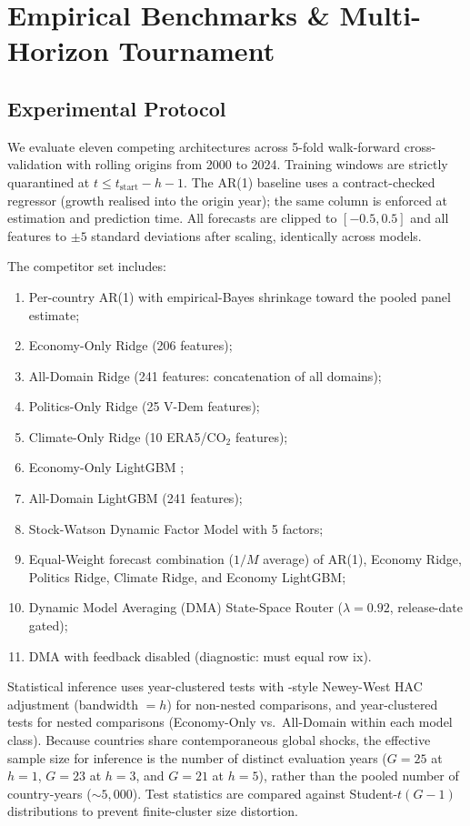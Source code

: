 \documentclass[11pt,a4paper]{article}
\begin{document}
\section{Empirical Benchmarks \& Multi-Horizon Tournament}
\label{sec:benchmarks}

\subsection{Experimental Protocol}

We evaluate eleven competing architectures across 5-fold walk-forward cross-validation with rolling origins from 2000 to 2024. Training windows are strictly quarantined at $t \le t_{\text{start}} - h - 1$. The AR(1) baseline uses a contract-checked regressor (growth realised into the origin year); the same column is enforced at estimation and prediction time. All forecasts are clipped to $[-0.5, 0.5]$ and all features to $\pm 5$ standard deviations after scaling, identically across models.

The competitor set includes:
\begin{enumerate}[leftmargin=*, label=(\roman*)]
    \item Per-country AR(1) with empirical-Bayes shrinkage toward the pooled panel estimate;
    \item Economy-Only Ridge (206 features);
    \item All-Domain Ridge (241 features: concatenation of all domains);
    \item Politics-Only Ridge (25 V-Dem features);
    \item Climate-Only Ridge (10 ERA5/CO$_2$ features);
    \item Economy-Only LightGBM \citep{ke2017lightgbm};
    \item All-Domain LightGBM (241 features);
    \item Stock-Watson Dynamic Factor Model \citep{stock2002} with 5 factors;
    \item Equal-Weight forecast combination ($1/M$ average) of AR(1), Economy Ridge, Politics Ridge, Climate Ridge, and Economy LightGBM;
    \item Dynamic Model Averaging (DMA) State-Space Router ($\lambda = 0.92$, release-date gated);
    \item DMA with feedback disabled (diagnostic: must equal row ix).
\end{enumerate}

Statistical inference uses year-clustered \citet{diebold1995} tests with \citet{driscollkraay1998}-style Newey-West HAC adjustment (bandwidth $= h$) for non-nested comparisons, and year-clustered \citet{clark2007} tests for nested comparisons (Economy-Only vs.\ All-Domain within each model class). Because countries share contemporaneous global shocks, the effective sample size for inference is the number of distinct evaluation years ($G = 25$ at $h=1$, $G = 23$ at $h=3$, and $G = 21$ at $h=5$), rather than the pooled number of country-years (${\sim}5{,}000$). Test statistics are compared against Student-$t(G-1)$ distributions to prevent finite-cluster size distortion.
\end{document}
